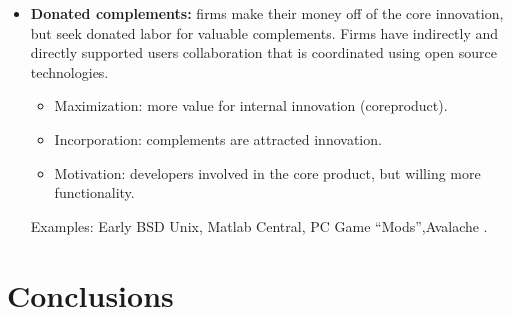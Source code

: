 \begin{itemize}
 \item \textbf{Donated complements:} firms make their money off of the core innovation, but seek donated labor for valuable complements. Firms have indirectly and directly supported users collaboration that is coordinated using open source technologies.

	\begin{itemize}
		\item Maximization: more value for internal innovation (coreproduct).
		\item Incorporation: complements are attracted innovation.
		\item Motivation: developers involved in the core product, but willing more functionality.
	\end{itemize}
Examples: Early BSD Unix, Matlab Central, PC Game “Mods”,Avalache .
\end{itemize}


 


\section{Conclusions}\label{conclusions}
